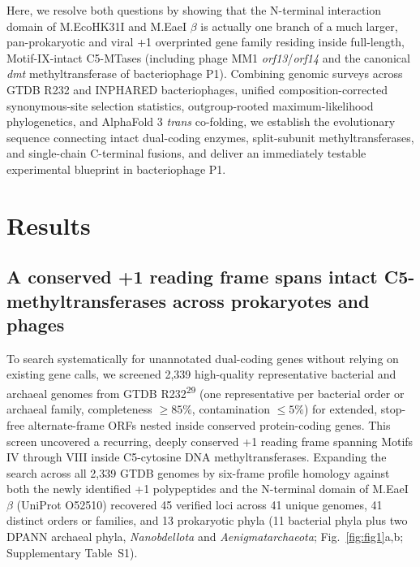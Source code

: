 \documentclass[10pt,letterpaper]{article}
\newcommand{\spname}[1]{\textit{#1}}
\newcommand{\gene}[1]{\textit{#1}}
\newcommand{\refsup}[1]{\textsuperscript{#1}}
\begin{document}
Here, we resolve both questions by showing that the N-terminal interaction domain of M.EcoHK31I and M.EaeI $\beta$ is actually one branch of a much larger, pan-prokaryotic and viral +1 overprinted gene family residing inside full-length, Motif-IX-intact C5-MTases (including phage MM1 \gene{orf13}/\gene{orf14} and the canonical \gene{dmt} methyltransferase of bacteriophage P1). Combining genomic surveys across GTDB R232 and INPHARED bacteriophages, unified composition-corrected synonymous-site selection statistics, outgroup-rooted maximum-likelihood phylogenetics, and AlphaFold 3 \textit{trans} co-folding, we establish the evolutionary sequence connecting intact dual-coding enzymes, split-subunit methyltransferases, and single-chain C-terminal fusions, and deliver an immediately testable experimental blueprint in bacteriophage P1.

\section{Results}

\subsection{A conserved +1 reading frame spans intact C5-methyltransferases across prokaryotes and phages}

To search systematically for unannotated dual-coding genes without relying on existing gene calls, we screened 2,339 high-quality representative bacterial and archaeal genomes from GTDB R232\refsup{29} (one representative per bacterial order or archaeal family, completeness $\ge 85\%$, contamination $\le 5\%$) for extended, stop-free alternate-frame ORFs nested inside conserved protein-coding genes. This screen uncovered a recurring, deeply conserved +1 reading frame spanning Motifs IV through VIII inside C5-cytosine DNA methyltransferases. Expanding the search across all 2,339 GTDB genomes by six-frame profile homology against both the newly identified +1 polypeptides and the N-terminal domain of M.EaeI $\beta$ (UniProt O52510) recovered 45 verified loci across 41 unique genomes, 41 distinct orders or families, and 13 prokaryotic phyla (11 bacterial phyla plus two DPANN archaeal phyla, \spname{Nanobdellota} and \spname{Aenigmatarchaeota}; Fig.~\ref{fig:fig1}a,b; Supplementary Table~S1).
\end{document}
